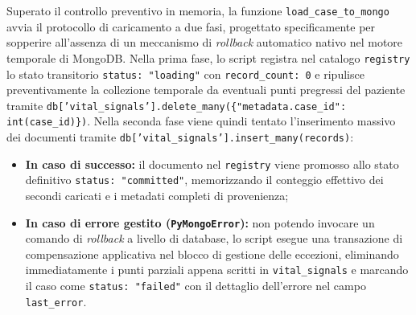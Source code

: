 Superato il controllo preventivo in memoria, la funzione \texttt{load\_case\_to\_mongo} avvia il protocollo di caricamento a due fasi, progettato specificamente per sopperire all'assenza di un meccanismo di \textit{rollback} automatico nativo nel motore temporale di MongoDB. Nella prima fase, lo script registra nel catalogo \texttt{registry} lo stato transitorio \texttt{status: "loading"} con \texttt{record\_count: 0} e ripulisce preventivamente la collezione temporale da eventuali punti pregressi del paziente tramite \texttt{db['vital\_signals'].delete\_many(\{"metadata.case\_id": int(case\_id)\})}. Nella seconda fase viene quindi tentato l'inserimento massivo dei documenti tramite \texttt{db['vital\_signals'].insert\_many(records)}:
\begin{itemize}
    \item \textbf{In caso di successo:} il documento nel \texttt{registry} viene promosso allo stato definitivo \texttt{status: "committed"}, memorizzando il conteggio effettivo dei secondi caricati e i metadati completi di provenienza;    \item \textbf{In caso di errore gestito (\texttt{PyMongoError}):} non potendo invocare un comando di \textit{rollback} a livello di database, lo script esegue una transazione di compensazione applicativa nel blocco di gestione delle eccezioni, eliminando immediatamente i punti parziali appena scritti in \texttt{vital\_signals} e marcando il caso come \texttt{status: "failed"} con il dettaglio dell'errore nel campo \texttt{last\_error}.\end{itemize}


